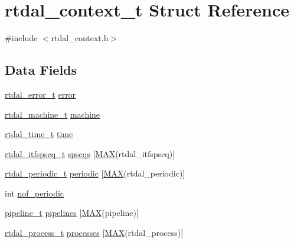 \hypertarget{structrtdal__context__t}{\section{rtdal\-\_\-context\-\_\-t Struct Reference}
\label{structrtdal__context__t}
}


{\ttfamily \#include $<$rtdal\-\_\-context.\-h$>$}

\subsection*{Data Fields}
\begin{DoxyCompactItemize}
\item 
\hyperlink{structrtdal__error__t}{rtdal\-\_\-error\-\_\-t} \hyperlink{structrtdal__context__t_a16a803b2fd237c6c6af02727f13cca78}{error}
\item 
\hyperlink{structrtdal__machine__t}{rtdal\-\_\-machine\-\_\-t} \hyperlink{structrtdal__context__t_a3eb563f1d3980bcfa87524bd53e6a636}{machine}
\item 
\hyperlink{structrtdal__time__t}{rtdal\-\_\-time\-\_\-t} \hyperlink{structrtdal__context__t_a8b7974854cfddeeb16a0b687124a8d34}{time}
\item 
\hyperlink{structrtdal__itfspscq__t}{rtdal\-\_\-itfspscq\-\_\-t} \hyperlink{structrtdal__context__t_a089a2c82209dab33ed6b053fd455ddc6}{spscqs} \mbox{[}\hyperlink{objects__max_8h_a5ec0a30768a338a08d7e0c296475a2cf}{M\-A\-X}(rtdal\-\_\-itfspscq)\mbox{]}
\item 
\hyperlink{structrtdal__periodic__t}{rtdal\-\_\-periodic\-\_\-t} \hyperlink{structrtdal__context__t_afdf9752c171c9dca028d37a8e92e02bc}{periodic} \mbox{[}\hyperlink{objects__max_8h_a5ec0a30768a338a08d7e0c296475a2cf}{M\-A\-X}(rtdal\-\_\-periodic)\mbox{]}
\item 
int \hyperlink{structrtdal__context__t_a25c299df028c7b7b256ecd36b10b0c74}{nof\-\_\-periodic}
\item 
\hyperlink{structpipeline__t}{pipeline\-\_\-t} \hyperlink{structrtdal__context__t_a772193d8fa3cedd8888abc472dfe38de}{pipelines} \mbox{[}\hyperlink{objects__max_8h_a5ec0a30768a338a08d7e0c296475a2cf}{M\-A\-X}(pipeline)\mbox{]}
\item 
\hyperlink{rtdal__process_8h_aae6bdd48dcdbb9e74bbfb3dd6cd72b2a}{rtdal\-\_\-process\-\_\-t} \hyperlink{structrtdal__context__t_a6b152d6315f1adb5fb53cd7005923ed8}{processes} \mbox{[}\hyperlink{objects__max_8h_a5ec0a30768a338a08d7e0c296475a2cf}{M\-A\-X}(rtdal\-\_\-process)\mbox{]}

\end{DoxyCompactItemize}
